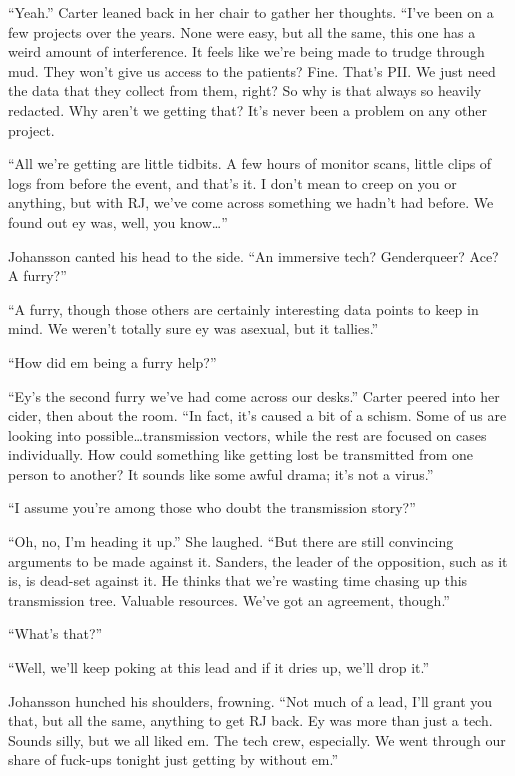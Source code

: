 ``Yeah.'' Carter leaned back in her chair to gather her thoughts. ``I've been on a few projects over the years. None were easy, but all the same, this one has a weird amount of interference. It feels like we're being made to trudge through mud. They won't give us access to the patients? Fine. That's PII. We just need the data that they collect from them, right? So why is that always so heavily redacted. Why aren't we getting that? It's never been a problem on any other project.

``All we're getting are little tidbits. A few hours of monitor scans, little clips of logs from before the event, and that's it. I don't mean to creep on you or anything, but with RJ, we've come across something we hadn't had before. We found out ey was, well, you know\ldots{}''

Johansson canted his head to the side. ``An immersive tech? Genderqueer? Ace? A furry?''

``A furry, though those others are certainly interesting data points to keep in mind. We weren't totally sure ey was asexual, but it tallies.''

``How did em being a furry help?''

``Ey's the second furry we've had come across our desks.'' Carter peered into her cider, then about the room. ``In fact, it's caused a bit of a schism. Some of us are looking into possible\ldots{}transmission vectors, while the rest are focused on cases individually. How could something like getting lost be transmitted from one person to another? It sounds like some awful drama; it's not a virus.''

``I assume you're among those who doubt the transmission story?''

``Oh, no, I'm heading it up.'' She laughed. ``But there are still convincing arguments to be made against it. Sanders, the leader of the opposition, such as it is, is dead-set against it. He thinks that we're wasting time chasing up this transmission tree. Valuable resources. We've got an agreement, though.''

``What's that?''

``Well, we'll keep poking at this lead and if it dries up, we'll drop it.''

Johansson hunched his shoulders, frowning. ``Not much of a lead, I'll grant you that, but all the same, anything to get RJ back. Ey was more than just a tech. Sounds silly, but we all liked em. The tech crew, especially. We went through our share of fuck-ups tonight just getting by without em.''

